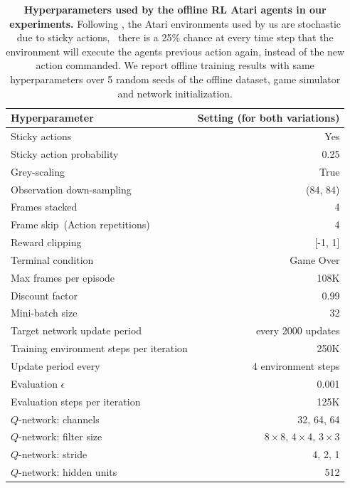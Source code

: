 \begin{table}[t]
\small
\caption{\textbf{Hyperparameters used by the offline RL Atari agents in our experiments.} Following \citet{agarwal2019optimistic}, the Atari environments used by us are stochastic due to sticky actions, \ie\ there is a 25\% chance at every time step that the environment will execute the agents previous action again, instead of the new action commanded. We report offline training results with same hyperparameters over 5 random seeds of the offline dataset, game simulator and network initialization.} 
\centering
\begin{tabular}{lrr}
\toprule
Hyperparameter & \multicolumn{2}{r}{Setting (for both variations)} \\
\midrule
Sticky actions && Yes        \\
Sticky action probability && 0.25\\
Grey-scaling && True \\
Observation down-sampling && (84, 84) \\
Frames stacked && 4 \\
Frame skip~(Action repetitions) && 4 \\
Reward clipping && [-1, 1] \\
Terminal condition && Game Over \\
Max frames per episode && 108K \\
Discount factor && 0.99 \\
Mini-batch size && 32 \\
Target network update period & \multicolumn{2}{r}{every 2000 updates} \\
Training environment steps per iteration && 250K \\
Update period every && 4 environment steps \\
Evaluation $\epsilon$ && 0.001 \\
Evaluation steps per iteration && 125K \\
$Q$-network: channels && 32, 64, 64 \\
$Q$-network: filter size && $8\times8$, $4\times4$, $3\times3$\\
$Q$-network: stride && 4, 2, 1\\
$Q$-network: hidden units && 512 \\
\bottomrule
\end{tabular}
\label{table:hyperparams_atari}
\end{table}

\vspace{-0.2cm}
